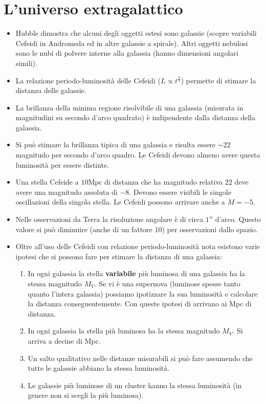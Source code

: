 \documentclass[11pt,a4paper]{article}
\begin{document}
\section{L'universo extragalattico}
\begin{itemize}
\item Hubble dimostra che alcuni degli oggetti estesi sono galassie (scopre variabili Cefeidi in Andromeda ed in altre galassie a spirale). Altri oggetti nebulosi sono le nubi di polvere interne alla galassia (hanno dimensioni angolari simili).

\item La relazione periodo-luminosità delle Cefeidi ($L \propto t^{\frac{4}{3}}$) permette di stimare la distanza delle galassie.

\item La brillanza della minima regione risolvibile di una galassia (misurata in magnitudini su secondo d'arco quadrato) è indipendente dalla distanza della galassia.

\item Si può stimare la brillanza tipica di una galassia e risulta essere $\sim 22$ magnitudo per secondo d'arco quadro. Le Cefeidi devono almeno avere questa luminosità per essere distinte.

\item Una stella Cefeide a $10 	\text{Mpc}$ di distanza che ha magnitudo relativa $22$ deve avere una magnitudo assoluta di $-8$. Devono essere visibili le singole oscillazioni della singola stella. Le Cefeidi possono arrivare anche a $M = -5$. 

\item Nelle osservazioni da Terra la risoluzione angolare è di circa $1''$ d'arco. Questo valore si può diminuire (anche di un fattore $10$) per osservazioni dallo spazio.

\item Oltre all'uso delle Cefeidi con relazione periodo-luminosità nota esistono varie ipotesi che si possono fare per stimare la distanza di una galassia:

\begin{enumerate}
\item In ogni galassia la stella \textbf{variabile} più luminosa di una galassia ha la stessa magnitudo $M_V$. Se vi è una supernova (luminose spesse tanto quanto l'intera galassia) possiamo ipotizzare la sua luminosità e calcolare la distanza conseguentemente.
Con queste ipotesi di arrivano ai Mpc di distanza.
\item In ogni galassia la stella più luminosa ha la stessa magnitudo $M_V$. Si arriva a decine di Mpc.
\item Un salto qualitativo nelle distanze misurabili si può fare assumendo che tutte le galassie abbiano la stessa luminosità.
\item Le galassie più luminose di un cluster hanno la stessa luminosità (in genere non si scegli la più luminosa).
\end{enumerate}


\end{itemize}
\end{document}
